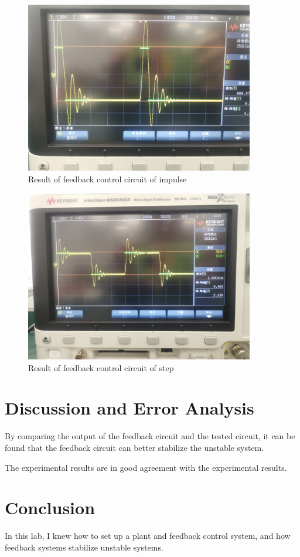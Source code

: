 \documentclass[a4paper]{article}
\begin{document}
    \begin{figure}[H]
        \centering
        \includegraphics[width=10cm]{impulse2.jpg}
        \caption{Result of feedback control circuit of impulse}
    \end{figure}

    \begin{figure}[H]
        \centering
        \includegraphics[width=10cm]{step2.jpg}
        \caption{Result of feedback control circuit of step}
    \end{figure}


    \section{Discussion and Error Analysis}
    By comparing the output of the feedback circuit and the tested circuit, it can be found that the feedback circuit can better stabilize the unstable system. \par
    
    The experimental results are in good agreement with the experimental results.

    \section{Conclusion}
    In this lab, I knew how to set up a plant and feedback control system, and how feedback systems stabilize unstable systems.
\end{document}
